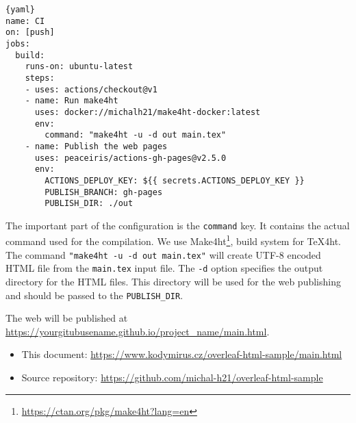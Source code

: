 \documentclass{article}
\newcommand{\cmdname}[1]{\texttt{#1}}
\newcommand\footurl[1]{\footnote{\url{#1}}}
\begin{document}
\begin{lstlisting}{yaml}
name: CI
on: [push]
jobs:
  build:
    runs-on: ubuntu-latest
    steps:
    - uses: actions/checkout@v1
    - name: Run make4ht
      uses: docker://michalh21/make4ht-docker:latest
      env:
        command: "make4ht -u -d out main.tex"
    - name: Publish the web pages
      uses: peaceiris/actions-gh-pages@v2.5.0
      env:
        ACTIONS_DEPLOY_KEY: ${{ secrets.ACTIONS_DEPLOY_KEY }}
        PUBLISH_BRANCH: gh-pages
        PUBLISH_DIR: ./out    
\end{lstlisting}

The important part of the configuration is the \cmdname{command} key. It contains the actual command used for the compilation. We use Make4ht\footurl{https://ctan.org/pkg/make4ht?lang=en}, build system for \TeX4ht.
    The command \verb|"make4ht -u -d out main.tex"| will create UTF-8 encoded HTML file from the \cmdname{main.tex} input file. The \texttt{-d} option specifies the output directory for the HTML files. This directory will be used for the web publishing and should be passed to the \verb|PUBLISH_DIR|.

The web will be published at \url{https://yourgitubusename.github.io/project_name/main.html}. 

\begin{itemize}
    \item This document: \url{https://www.kodymirus.cz/overleaf-html-sample/main.html}
    \item Source repository: \url{https://github.com/michal-h21/overleaf-html-sample} 
\end{itemize}
 
\end{document}
